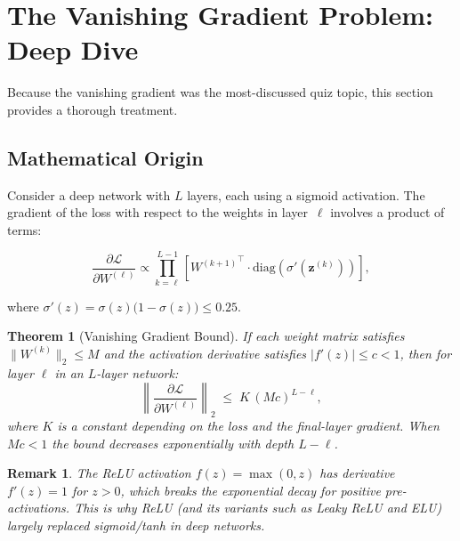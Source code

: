 \documentclass[12pt,a4paper]{article}
\newtheorem{theorem}{Theorem}[section]
\newtheorem{remark}{Remark}[section]
\newcommand{\loss}{\mathcal{L}}
\begin{document}
\section{The Vanishing Gradient Problem: Deep Dive}
\label{sec:vanishing_gradient}

Because the vanishing gradient was the most-discussed quiz topic, this
section provides a thorough treatment.

\subsection{Mathematical Origin}
\label{ssec:vg_math}

Consider a deep network with $L$ layers, each using a sigmoid
activation.  The gradient of the loss with respect to the weights in
layer~$\ell$ involves a product of terms:

\begin{equation}
  \frac{\partial \loss}{\partial W^{(\ell)}}
  \propto
  \prod_{k=\ell}^{L-1}
  \left[ {W^{(k+1)}}^{\!\top} \cdot \text{diag}\!\left(\sigma'\!\left(\mathbf{z}^{(k)}\right)\right) \right],
  \label{eq:vanishing_product}
\end{equation}

\noindent
where $\sigma'(z) = \sigma(z)\bigl(1-\sigma(z)\bigr) \leq 0.25$.

\begin{theorem}[Vanishing Gradient Bound]
\label{thm:vanishing}
If each weight matrix satisfies $\|W^{(k)}\|_2 \leq M$ and the
activation derivative satisfies $|f'(z)| \leq c < 1$, then for layer
$\ell$ in an $L$-layer network:
\begin{equation}
  \left\|\frac{\partial\loss}{\partial W^{(\ell)}}\right\|_2
  \;\leq\;
  K\,(Mc)^{L-\ell},
  \label{eq:vanishing_bound}
\end{equation}
where $K$ is a constant depending on the loss and the final-layer
gradient.  When $Mc < 1$ the bound decreases \emph{exponentially} with
depth $L - \ell$.
\end{theorem}

\begin{remark}
\label{rem:relu_fix}
The ReLU activation $f(z)=\max(0,z)$ has derivative $f'(z)=1$ for
$z>0$, which breaks the exponential decay for positive pre-activations.
This is why ReLU (and its variants such as Leaky ReLU and ELU) largely
replaced sigmoid/tanh in deep networks.
\end{remark}
\end{document}
